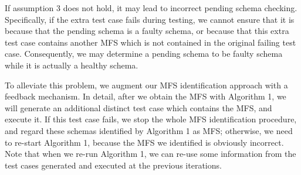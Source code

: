 \documentclass{sig-alternate-05-2015}
\begin{document}
{{{{If assumption 3 does not hold, it may lead to incorrect pending schema checking. Specifically, if the extra test case fails during testing, we cannot ensure that it is because that the pending schema is a faulty schema, or because that this extra test case contains another MFS which is not contained in the original failing test case. Consequently, we may determine a pending schema to be faulty schema while it is actually a healthy schema.

To alleviate this problem, we augment our MFS identification approach with a feedback mechanism. In detail, after we obtain the MFS with Algorithm 1, we will generate an additional distinct test case which contains the MFS, and execute it. If this test case fails, we stop the whole MFS identification procedure, and regard these schemas identified by Algorithm 1 as MFS; otherwise, we need to re-start Algorithm 1, because the MFS we identified is obviously incorrect. Note that when we re-run Algorithm 1, we can re-use some information from the test cases generated and executed at the previous iterations.

%

%

}}}}
\end{document}
